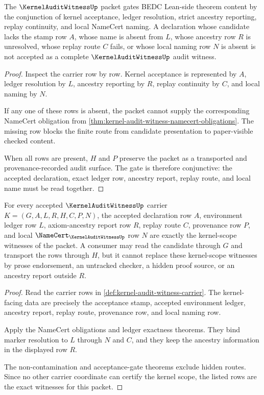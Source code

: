 \begin{theorem}
\label{thm:kernel-audit-witness-acceptance-gate}
The $\KernelAuditWitnessUp$ packet gates BEDC Lean-side theorem content by the conjunction of kernel acceptance, ledger resolution, strict ancestry reporting, replay continuity, and local NameCert naming. A declaration whose candidate lacks the stamp row $A$, whose name is absent from $L$, whose ancestry row $R$ is unresolved, whose replay route $C$ fails, or whose local naming row $N$ is absent is not accepted as a complete $\KernelAuditWitnessUp$ audit witness.
\end{theorem}
\begin{proof}
Inspect the carrier row by row. Kernel acceptance is represented by $A$, ledger resolution by $L$, ancestry reporting by $R$, replay continuity by $C$, and local naming by $N$.

If any one of these rows is absent, the packet cannot supply the corresponding NameCert obligation from \autoref{thm:kernel-audit-witness-namecert-obligations}. The missing row blocks the finite route from candidate presentation to paper-visible checked content.

When all rows are present, $H$ and $P$ preserve the packet as a transported and provenance-recorded audit surface. The gate is therefore conjunctive: the accepted declaration, exact ledger row, ancestry report, replay route, and local name must be read together.
\end{proof}

\begin{theorem}
\label{thm:kernelauditwitness-kernel-scope-binding}
For every accepted $\KernelAuditWitnessUp$ carrier $K=(G,A,L,R,H,C,P,N)$, the accepted declaration row $A$, environment ledger row $L$, axiom-ancestry report row $R$, replay route $C$, provenance row $P$, and local $\NameCert_{\KernelAuditWitnessUp}$ row $N$ are exactly the kernel-scope witnesses of the packet. A consumer may read the candidate through $G$ and transport the rows through $H$, but it cannot replace these kernel-scope witnesses by prose endorsement, an untracked checker, a hidden proof source, or an ancestry report outside $R$.
\end{theorem}
\begin{proof}
Read the carrier rows in \autoref{def:kernel-audit-witness-carrier}. The kernel-facing data are precisely the acceptance stamp, accepted environment ledger, ancestry report, replay route, provenance row, and local naming row.

Apply the NameCert obligations and ledger exactness theorems. They bind marker resolution to $L$ through $N$ and $C$, and they keep the ancestry information in the displayed row $R$.

The non-contamination and acceptance-gate theorems exclude hidden routes. Since no other carrier coordinate can certify the kernel scope, the listed rows are the exact witnesses for this packet.
\end{proof}


